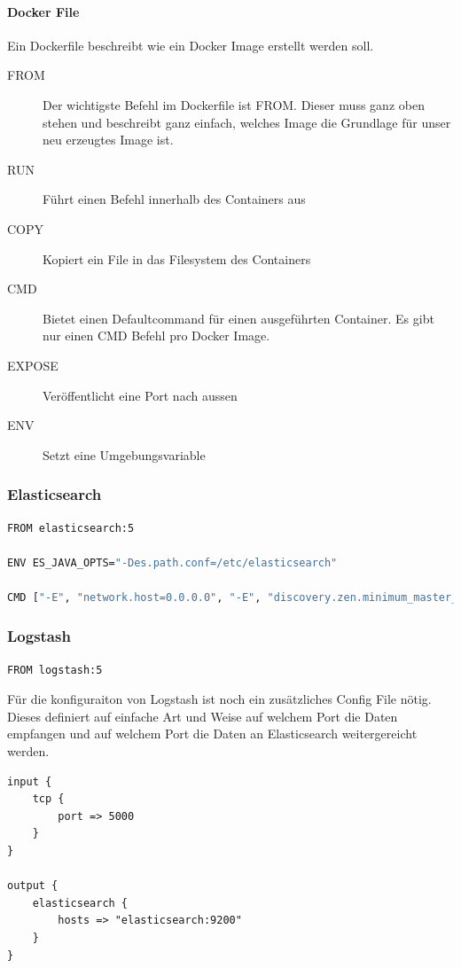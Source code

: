\paragraph{Docker File}
Ein Dockerfile beschreibt wie ein Docker Image erstellt werden soll. 
\begin{description}
	\item[FROM] Der wichtigste Befehl im Dockerfile ist FROM. Dieser muss ganz oben stehen und beschreibt ganz einfach, welches Image die Grundlage für unser neu erzeugtes Image ist.	
	\item[RUN] Führt einen Befehl innerhalb des Containers aus
	\item[COPY] Kopiert ein File in das Filesystem des Containers
	\item[CMD] Bietet einen Defaultcommand für einen ausgeführten Container. Es gibt nur einen CMD Befehl pro Docker Image.
	\item[EXPOSE] Veröffentlicht eine Port nach aussen
	\item[ENV] Setzt eine Umgebungsvariable
\end{description}

\subsubsection{Elasticsearch}
\begin{lstlisting}[caption=Elasticsearch Dockerfile, language=bash]
FROM elasticsearch:5

ENV ES_JAVA_OPTS="-Des.path.conf=/etc/elasticsearch"

CMD ["-E", "network.host=0.0.0.0", "-E", "discovery.zen.minimum_master_nodes=1"]
\end{lstlisting}

\subsubsection{Logstash} 
\begin{lstlisting}[caption=Logstash Dockerfile, language=bash]
FROM logstash:5
\end{lstlisting}

Für die konfiguraiton von Logstash ist noch ein zusätzliches Config File nötig. Dieses definiert auf einfache Art und Weise auf welchem Port die Daten empfangen und auf welchem Port die Daten an Elasticsearch weitergereicht werden.
\begin{lstlisting}
input {
	tcp {
		port => 5000
	}
}

output {
	elasticsearch {
		hosts => "elasticsearch:9200"
	}
}
\end{lstlisting}

